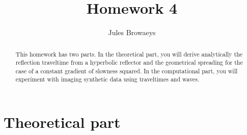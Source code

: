 \author{Jules Browaeys}
\title{Homework 4}

\begin{abstract}
  This homework has two parts. In the theoretical part, you will
  derive analytically the reflection traveltime from a hyperbolic
  reflector and the geometrical spreading for the case of a constant
  gradient of slowness squared.  In the computational part, you will
  experiment with imaging synthetic data using traveltimes and waves.
\end{abstract}

\lstset{language=python,numbers=left,numberstyle=\tiny,showstringspaces=false}

\section{Theoretical part}

